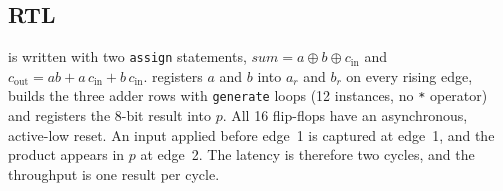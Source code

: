 \documentclass[conference,10pt]{IEEEtran}
\begin{document}
\subsection{RTL}
 is written with two \texttt{assign} statements,
$\mathit{sum} = a \oplus b \oplus c_{\mathrm{in}}$ and
$c_{\mathrm{out}} = ab + a\,c_{\mathrm{in}} + b\,c_{\mathrm{in}}$.
 registers $a$ and $b$ into $a_r$ and $b_r$ on every rising edge, builds the three
adder rows with \texttt{generate} loops (12  instances, no \texttt{*} operator) and
registers the 8-bit result into $p$. All 16 flip-flops have an asynchronous, active-low reset. An
input applied before edge~1 is captured at edge~1, and the product appears in $p$ at edge~2. The
latency is therefore two cycles, and the throughput is one result per cycle.
\end{document}
